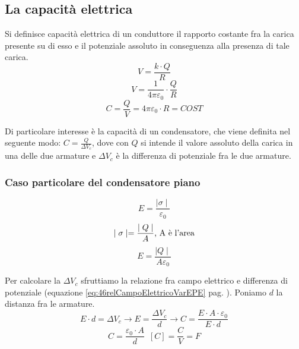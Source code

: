 \subsection{La capacità elettrica}
    \par Si definisce capacità elettrica di un conduttore il rapporto costante fra la carica presente su di esso e il potenziale assoluto in conseguenza alla presenza di tale carica.
    \begin{equation*}
        V=\frac{k\cdot Q}{R}
    \end{equation*}
    \begin{equation*}
        V=\frac{1}{4\pi\varepsilon_0}\cdot\frac{Q}{R}
    \end{equation*}
    \begin{equation}\label{eq:46Capacita}
        C=\frac{Q}{V}=4\pi\varepsilon_0\cdot R=COST
    \end{equation}
    \par Di particolare interesse è la capacità di un condensatore, che viene definita nel seguente modo: $C=\frac{Q}{\Delta V_c}$, dove con $Q$ si intende il valore assoluto della carica in una delle due armature e $\Delta V_c$ è la differenza di potenziale fra le due armature.
    \subsubsection{Caso particolare del condensatore piano}
        \begin{equation*}
            E=\frac{\mid\sigma\mid}{\varepsilon_0}
        \end{equation*}
        \begin{equation*}
            \mid\sigma\mid=\frac{\mid Q \mid}{A} \textnormal{, A è l'area}
        \end{equation*}
        \begin{equation*}
            E=\frac{\mid Q \mid}{A\varepsilon_0}
        \end{equation*}
        \par Per calcolare la $\Delta V_c$ sfruttiamo la relazione fra campo elettrico e differenza di potenziale (equazione \ref{eq:46relCampoElettricoVarEPE} pag.  \pageref{eq:46relCampoElettricoVarEPE}). Poniamo $d$ la distanza fra le armature.
        \begin{equation*}
            E\cdot d=\Delta V_c \rightarrow E=\frac{\Delta V_c}{d} \rightarrow C=\frac{E\cdot A \cdot\varepsilon_0}{E\cdot d}
        \end{equation*}
        \begin{equation}
            C=\frac{\varepsilon_0\cdot A}{d} \enspace [C]=\frac{C}{V}=F
        \end{equation}
